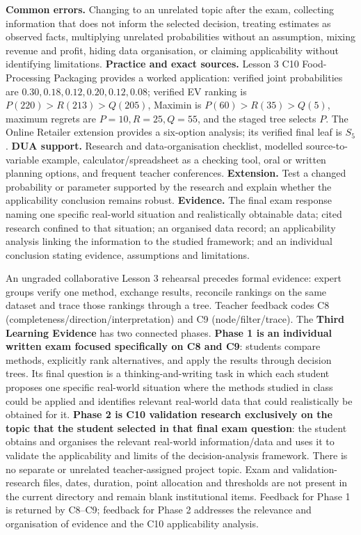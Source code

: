\documentclass[10pt,letterpaper]{article}
\newcommand{\partheading}[1]{\Needspace{7\baselineskip}\par\vspace{4pt}{\bfseries #1\par}}
\begin{document}
\textbf{Common errors.} Changing to an unrelated topic after the exam,
collecting information that does not inform the selected decision, treating
estimates as observed facts, multiplying unrelated probabilities without an
assumption, mixing revenue and profit, hiding data organisation, or claiming
applicability without identifying limitations. \textbf{Practice and exact
sources.} Lesson 3 C10 Food-Processing Packaging provides a worked application:
verified joint probabilities are $0.30,0.18,0.12,0.20,0.12,0.08$; verified EV
ranking is $P(220)>R(213)>Q(205)$, Maximin is $P(60)>R(35)>Q(5)$, maximum
regrets are $P=10,R=25,Q=55$, and the staged tree selects $P$. The Online
Retailer extension provides a six-option analysis; its verified final leaf is
$S_5$. \textbf{DUA support.} Research and data-organisation checklist, modelled
source-to-variable example, calculator/spreadsheet as a checking tool, oral or
written planning options, and frequent teacher conferences. \textbf{Extension.}
Test a changed probability or parameter supported by the research and explain
whether the applicability conclusion remains robust. \textbf{Evidence.} The
final exam response naming one specific real-world situation and realistically
obtainable data; cited research confined to that situation; an organised data
record; an applicability analysis linking the information to the studied
framework; and an individual conclusion stating evidence, assumptions and
limitations.

\partheading{Practice and Assessment---Third Learning Evidence}
An ungraded collaborative Lesson 3 rehearsal precedes formal evidence: expert
groups verify one method, exchange results, reconcile rankings on the same
dataset and trace those rankings through a tree. Teacher feedback codes C8
(completeness/direction/interpretation) and C9 (node/filter/trace).
The \textbf{Third Learning Evidence} has two connected phases.
\textbf{Phase 1 is an individual written exam focused specifically on C8 and
C9}: students compare methods, explicitly rank alternatives, and apply the
results through decision trees. Its final question is a thinking-and-writing
task in which each student proposes one specific real-world situation where
the methods studied in class could be applied and identifies relevant
real-world data that could realistically be obtained for it. \textbf{Phase 2
is C10 validation research exclusively on the topic that the student selected
in that final exam question}: the student obtains and organises the relevant
real-world information/data and uses it to validate the applicability and
limits of the decision-analysis framework. There is no separate or unrelated
teacher-assigned project topic. Exam and validation-research files, dates,
duration, point allocation and thresholds are not present in the current
directory and remain blank institutional items. Feedback for Phase 1 is
returned by C8--C9; feedback for Phase 2 addresses the relevance and
organisation of evidence and the C10 applicability analysis.
\end{document}
